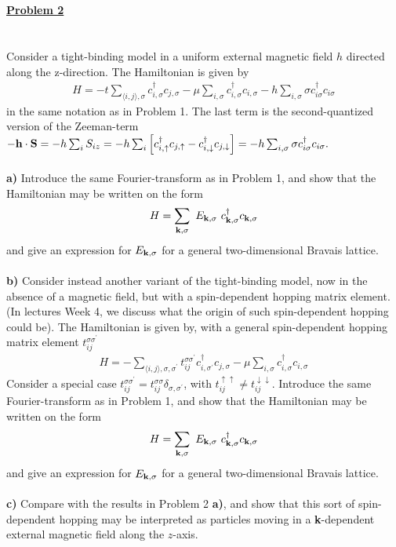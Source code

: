 \documentclass{article}
\begin{document}
\ \\
\ \\
\underline{\large\bf Problem 2}\\
\ \\
\ \\
Consider a tight-binding model in a uniform external magnetic field $h$ directed along the z-direction.
The Hamiltonian is given by 
\begin{eqnarray}
H = - t \sum_{\langle i,j \rangle, \sigma} c^{\dagger}_{i,\sigma} c_{j,\sigma} - \mu   \sum_{ i, \sigma} c^{\dagger}_{i,\sigma} c_{i,\sigma}
- h \sum_{i, \sigma} \sigma c^{\dagger}_{i \sigma}  c_{i \sigma}  
 \nonumber 
\end{eqnarray}
in the same notation as in Problem 1. The last term is the second-quantized version of the Zeeman-term 
$- {\bf h} \cdot {\bf S} = - h \sum_i S_{i z} = - h \sum_{i} \left[ c^{\dagger}_{i,\uparrow} c_{j,\uparrow}- c^{\dagger}_{i,\downarrow} c_{j,\downarrow} \right] =-  h \sum_{i, \sigma} \sigma c^{\dagger}_{i \sigma}  c_{i \sigma}.$
\ \\
\ \\
{\bf a)} Introduce the same Fourier-transform as in Problem 1, and show that the Hamiltonian may be written on the form
\begin{eqnarray}
H = \sum_{{\bf k},\sigma} ~ E_{\bf k, \sigma} ~ c^{\dagger}_{{\bf k},\sigma} c_{{\bf k},\sigma}  \nonumber 
\end{eqnarray}
and give an expression for $E_{{\bf k},\sigma}$ for a general two-dimensional Bravais lattice. 
\ \\
\ \\
{\bf b)}  Consider instead  another variant of the tight-binding model, now in the absence of a magnetic field, but with a spin-dependent hopping matrix element. (In lectures Week 4, we discuss what the origin of such spin-dependent hopping could be). The Hamiltonian is given by, with a general spin-dependent hopping matrix element $ t^{\sigma \sigma^{\prime}}_{ij}$
\begin{eqnarray}
H = -  \sum_{\langle i,j \rangle, \sigma, \sigma^{\prime}} t^{\sigma \sigma^{\prime}}_{ij}c^{\dagger}_{i,\sigma^{\prime}} c_{j,\sigma} - \mu   \sum_{ i, \sigma} c^{\dagger}_{i,\sigma} c_{i,\sigma}
 \nonumber 
\end{eqnarray}
 Consider a special case $ t^{\sigma \sigma^{\prime}}_{ij} = t^{\sigma \sigma}_{ij} \delta_{\sigma,\sigma^{\prime}}$, with 
 $t_{ij}^{\uparrow \uparrow} \neq t_{ij}^{\downarrow \downarrow}$.  Introduce the same Fourier-transform as in Problem 1, and show that the Hamiltonian may be written on the form
\begin{eqnarray}
H = \sum_{{\bf k},\sigma} ~ E_{\bf k, \sigma} ~ c^{\dagger}_{{\bf k},\sigma} c_{{\bf k},\sigma}  \nonumber 
\end{eqnarray}
and give an expression for $E_{{\bf k},\sigma}$ for a general two-dimensional Bravais lattice. 
\ \\
\ \\
{\bf c)} Compare with the results in Problem 2 {\bf a)}, and show that this sort of spin-dependent hopping may be interpreted as particles moving in  a {\bf k}-dependent external magnetic field along the $z$-axis.  
\end{document}
